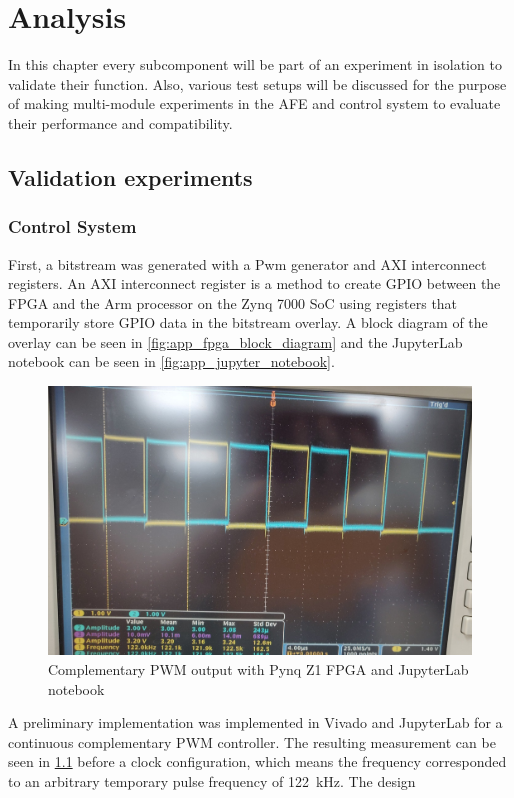 \chapter{Analysis}
In this chapter every subcomponent will be part of an experiment in isolation to validate their function. Also, various test setups will be discussed for the purpose of making multi-module experiments in the AFE and control system to evaluate their performance and compatibility.

\section{Validation experiments}
\subsection{Control System}
First, a bitstream was generated with a Pwm generator and AXI interconnect registers. An AXI interconnect register is a method to create GPIO between the FPGA and the Arm processor on the Zynq 7000 SoC using registers that temporarily store GPIO data in the bitstream overlay. A block diagram of the overlay can be seen in \cref{fig:app_fpga_block_diagram} and the JupyterLab notebook can be seen in \cref{fig:app_jupyter_notebook}.

\begin{figure}[htbp]
	\centering
	\includegraphics[width=.8\textwidth]{Figures/4_controlsystem_fpga_pwm.png}
	\caption{Complementary PWM output with Pynq Z1 FPGA and JupyterLab notebook}
	\label{fig:4_controlsystem_fpga_pwm}
\end{figure}
A preliminary implementation was implemented in Vivado and JupyterLab for a continuous complementary PWM controller. The resulting measurement can be seen in \cref{fig:4_controlsystem_fpga_pwm} before a clock configuration, which means the frequency corresponded to an arbitrary temporary pulse frequency of \qty{122}{\kilo\hertz}. The design

